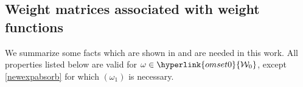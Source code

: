 \documentclass[11pt,a4paper]{article}
\theoremstyle{plain}
\theoremstyle{definition}
\let\on=\operatorname
\begin{document}
%

\subsection{Weight matrices associated with weight functions}\label{ssect.WeightMatricesFromFunctions}
We summarize some facts which are shown in \cite[Section 5]{compositionpaper} and are needed in this work. All properties listed below are valid for $\omega\in\hyperlink{omset0}{\mathcal{W}_0}$, except \eqref{newexpabsorb} for which \hyperlink{om1}{$(\omega_1)$} is necessary.
\end{document}
